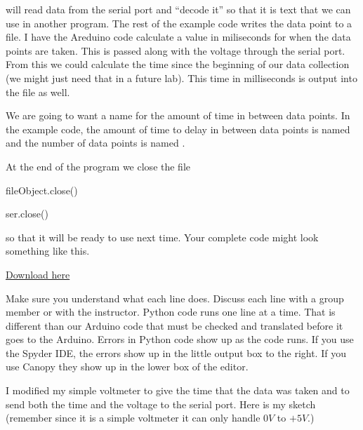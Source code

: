 \noindent will read data from the serial port and ``decode it'' so that it is text that we can use in another program. The rest of the example code writes the data point to a file. I have the Areduino code calculate a value in miliseconds for when the data points are taken. This is passed along with the voltage through the serial port. From this we could calculate the time since the beginning of our data collection (we might just need that in a future lab). This time in milliseconds is output into the file as well.

We are going to want a name for the amount of time in between data points. In the example code, the amount of time to delay in between data points is named  and the number of data points is named .

At the end of the program we close the file

\vspace{.1in}
\begin{python}
	fileObject.close()
\end{python}

\begin{python}
	ser.close()
\end{python}
\vspace{.1in}

\noindent so that it will be ready to use next time. Your complete code might look
something like this.

\href{https://raw.githubusercontent.com/rtlines/IntermediateLabPH250/main/Code/Data2Computer_PythonSide_Win.py}{Download here}


Make sure you understand what each line does. Discuss each line with a group member or with the instructor. Python code runs one line at a time. That is different than our Arduino code that must be checked and translated before it goes to the Arduino. Errors in Python code show up as the code runs. If you use the Spyder IDE, the errors show up in the little output box to the
right. If you use Canopy they show up in the lower box of the editor. 

I modified my simple voltmeter to give the time that the data was taken and to send both the time and the voltage to the serial port. Here is my sketch (remember since it is a simple voltmeter it can only handle $0\unit{V}$ to $+5\unit{V}.$)

